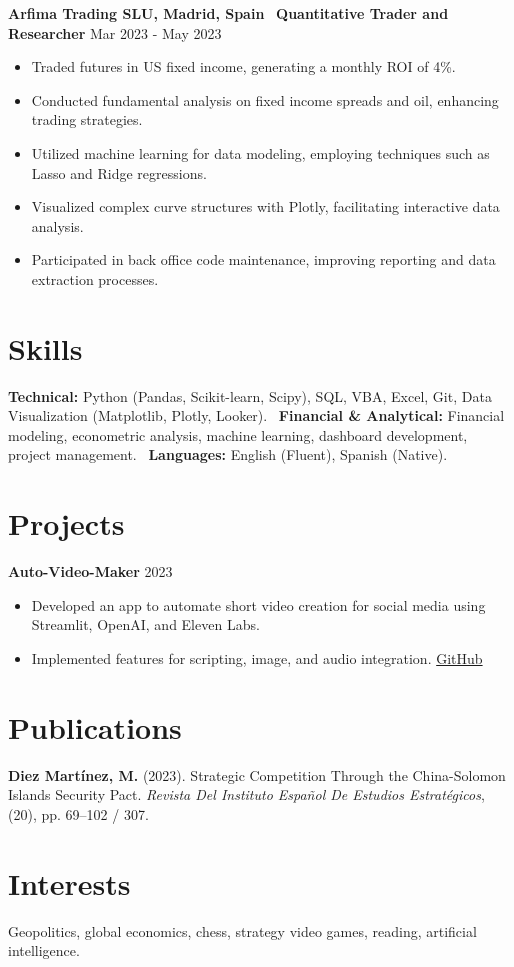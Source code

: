 \documentclass[a4paper,10pt]{article}
\begin{document}
\textbf{Arfima Trading SLU, Madrid, Spain} \
\textbf{Quantitative Trader and Researcher} \hfill Mar 2023 - May 2023
\begin{itemize}[left=0em]
    \item Traded futures in US fixed income, generating a monthly ROI of 4\%.
    \item Conducted fundamental analysis on fixed income spreads and oil, enhancing trading strategies.
    \item Utilized machine learning for data modeling, employing techniques such as Lasso and Ridge regressions.
    \item Visualized complex curve structures with Plotly, facilitating interactive data analysis.
    \item Participated in back office code maintenance, improving reporting and data extraction processes.
\end{itemize}

\section*{Skills}
\textbf{Technical:} Python (Pandas, Scikit-learn, Scipy), SQL, VBA, Excel, Git, Data Visualization (Matplotlib, Plotly, Looker). \
\textbf{Financial \& Analytical:} Financial modeling, econometric analysis, machine learning, dashboard development, project management. \
\textbf{Languages:} English (Fluent), Spanish (Native).

\section*{Projects}
\textbf{Auto-Video-Maker} \hfill 2023
\begin{itemize}[left=0em]
    \item Developed an app to automate short video creation for social media using Streamlit, OpenAI, and Eleven Labs.
    \item Implemented features for scripting, image, and audio integration. \href{https://github.com/elgask0/auto-video-maker}{GitHub}
\end{itemize}

\section*{Publications}
\textbf{Diez Martínez, M.} (2023). Strategic Competition Through the China-Solomon Islands Security Pact. \textit{Revista Del Instituto Español De Estudios Estratégicos}, (20), pp. 69–102 / 307.

\section*{Interests}
Geopolitics, global economics, chess, strategy video games, reading, artificial intelligence.
\end{document}
